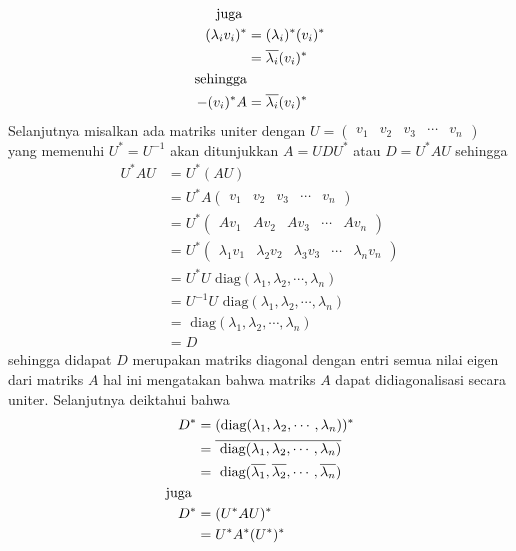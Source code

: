 \documentclass[11pt,a4paper]{article}
\theoremstyle{plain}
\theoremstyle{definition}
\theoremstyle{remark}
\begin{document}
\begin{enumerate}
\begin{enumerate}
\begin{align*}
	\text{juga } & \- \\
	(\lambda_{i} v_{i})^* &= (\lambda_{i})^* (v_{i})^* \\
	&= \overline{\lambda_{i}}(v_{i})^* \\
	\text{sehingga} & \- \\
	-(v_{i})^*A &= \overline{\lambda_{i}}(v_{i})^*
	\end{align*}
	Selanjutnya misalkan ada matriks uniter dengan $U=\begin{pmatrix}
	v_{1} & v_{2} & v_{3} & \cdots & v_{n}
	\end{pmatrix}$ yang memenuhi $U^*=U^{-1}$ akan ditunjukkan $A=UDU^*$ atau $D=U^*AU$ sehingga
	\begin{align*}
	U^*AU &= U^*(AU) \\
	&= U^* A\begin{pmatrix}
	v_{1} & v_{2} & v_{3} & \cdots & v_{n}
	\end{pmatrix} \\
	&= U^* \begin{pmatrix}
	Av_{1} & Av_{2} & Av_{3} & \cdots & Av_{n}
	\end{pmatrix} \\
	&= U^* \begin{pmatrix}
	\lambda_{1}v_{1} & \lambda_{2}v_{2} & \lambda_{3}v_{3} & \cdots & \lambda_{n}v_{n}
	\end{pmatrix} \\
	&= U^*U \text{ diag}(\lambda_{1},\lambda_{2},\cdots,\lambda_{n}) \\
	&= U^{-1}U \text{ diag}(\lambda_{1},\lambda_{2},\cdots,\lambda_{n}) \\
	&= \text{ diag}(\lambda_{1},\lambda_{2},\cdots,\lambda_{n}) \\
	&= D
	\end{align*}
	sehingga didapat $D$ merupakan matriks diagonal dengan entri semua nilai eigen dari matriks $A$ hal ini mengatakan bahwa matriks $A$ dapat didiagonalisasi secara uniter. Selanjutnya deiktahui bahwa
	\begin{align*}
	D^* &= (\text{diag}(\lambda_{1},\lambda_{2},\cdots,\lambda_{n}))^* \\
	&= \overline{\text{ diag}(\lambda_{1},\lambda_{2},\cdots,\lambda_{n})} \\
	&= \text{ diag}(\overline{\lambda_{1}},\overline{\lambda_{2}},\cdots,\overline{\lambda_{n}}) \\
	\text{juga } & \- \\
	D^* &= (U^*AU)^* \\
	&= U^* A^* (U^*)^* \\

\end{align*}
\end{enumerate}
\end{enumerate}
\end{document}
